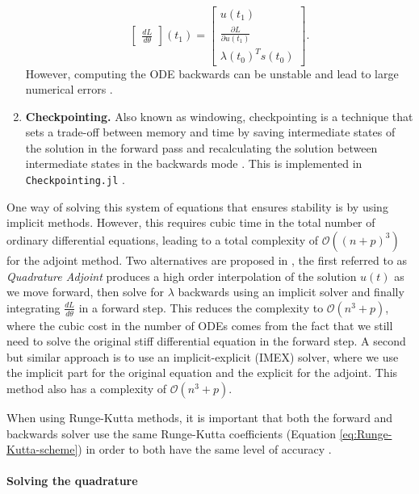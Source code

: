 \begin{enumerate}[label=(\roman*)]
\begin{equation}
\begin{bmatrix}
       \frac{dL}{d\theta}
    \end{bmatrix}(t_1)
    = 
    \begin{bmatrix}
       u(t_1) \\
       \frac{\partial L}{\partial u(t_1)} \\
       \lambda(t_0)^T s(t_0)
    \end{bmatrix}.
    \end{equation}
    However, computing the ODE backwards can be unstable and lead to large numerical errors \cite{kim_stiff_2021, Zhuang_2020}. 
    \item \textbf{Checkpointing. } Also known as windowing, checkpointing is a technique that sets a trade-off between memory and time by saving intermediate states of the solution in the forward pass and recalculating the solution between intermediate states in the backwards mode \cite{Griewank:2008kh, Checkpoiting_2023}. 
    This is implemented in \texttt{Checkpointing.jl} \cite{Checkpoiting_2023}.
\end{enumerate} 

One way of solving this system of equations that ensures stability is by using implicit methods. 
However, this requires cubic time in the total number of ordinary differential equations, leading to a total complexity of $\mathcal O((n+p)^3)$ for the adjoint method.
Two alternatives are proposed in \cite{kim_stiff_2021}, the first referred to as \textit{Quadrature Adjoint} produces a high order interpolation of the solution $u(t)$ as we move forward, then solve for $\lambda$ backwards using an implicit solver and finally integrating $\frac{dL}{d\theta}$ in a forward step.
This reduces the complexity to $\mathcal O (n^3 + p)$, where the cubic cost in the number of ODEs comes from the fact that we still need to solve the original stiff differential equation in the forward step. 
A second but similar approach is to use an implicit-explicit (IMEX) solver, where we use the implicit part for the original equation and the explicit for the adjoint. 
This method also has a complexity of $\mathcal O (n^3 + p)$.

When using Runge-Kutta methods, it is important that both the forward and backwards solver use the same Runge-Kutta coefficients (Equation \eqref{eq:Runge-Kutta-scheme}) in order to both have the same level of accuracy \cite{Alexe_Sandu_2009}.

\paragraph{Solving the quadrature}


